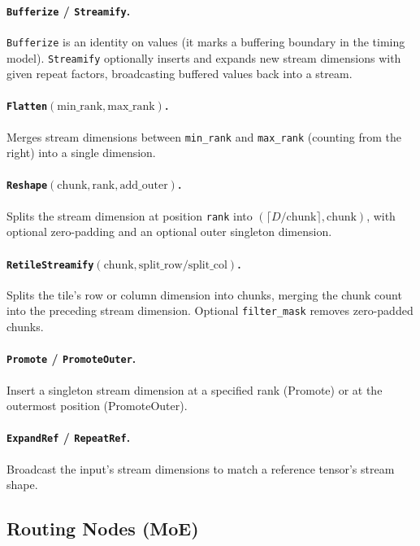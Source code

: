 \documentclass[11pt]{article}
\begin{document}
\paragraph{\texttt{Bufferize} / \texttt{Streamify}.}
\texttt{Bufferize} is an identity on values (it marks a buffering boundary in the timing model).
\texttt{Streamify} optionally inserts and expands new stream dimensions with given repeat factors, broadcasting buffered values back into a stream.

\paragraph{\texttt{Flatten}$(\text{min\_rank}, \text{max\_rank})$.}
Merges stream dimensions between \texttt{min\_rank} and \texttt{max\_rank} (counting from the right) into a single dimension.

\paragraph{\texttt{Reshape}$(\text{chunk}, \text{rank}, \text{add\_outer})$.}
Splits the stream dimension at position \texttt{rank} into $(\lceil D / \text{chunk} \rceil, \text{chunk})$, with optional zero-padding and an optional outer singleton dimension.

\paragraph{\texttt{RetileStreamify}$(\text{chunk}, \text{split\_row}/\text{split\_col})$.}
Splits the tile's row or column dimension into chunks, merging the chunk count into the preceding stream dimension.
Optional \texttt{filter\_mask} removes zero-padded chunks.

\paragraph{\texttt{Promote} / \texttt{PromoteOuter}.}
Insert a singleton stream dimension at a specified rank (Promote) or at the outermost position (PromoteOuter).

\paragraph{\texttt{ExpandRef} / \texttt{RepeatRef}.}
Broadcast the input's stream dimensions to match a reference tensor's stream shape.

\subsection{Routing Nodes (MoE)}
\end{document}

